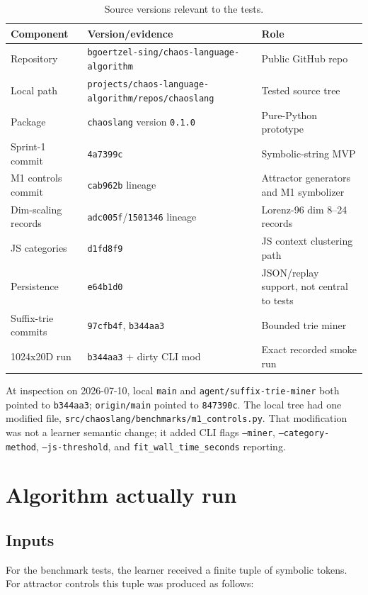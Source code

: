 \documentclass[11pt]{article}
\begin{document}
\begin{table}[ht]
\centering
\small
\begin{tabular}{lll}
\toprule
Component & Version/evidence & Role \\
\midrule
Repository & \texttt{bgoertzel-sing/chaos-language-algorithm} & Public GitHub repo \\
Local path & \texttt{projects/chaos-language-algorithm/repos/chaoslang} & Tested source tree \\
Package & \texttt{chaoslang} version \texttt{0.1.0} & Pure-Python prototype \\
Sprint-1 commit & \texttt{4a7399c} & Symbolic-string MVP \\
M1 controls commit & \texttt{cab962b} lineage & Attractor generators and M1 symbolizer \\
Dim-scaling records & \texttt{adc005f}/\texttt{1501346} lineage & Lorenz-96 dim 8--24 records \\
JS categories & \texttt{d1fd8f9} & JS context clustering path \\
Persistence & \texttt{e64b1d0} & JSON/replay support, not central to tests \\
Suffix-trie commits & \texttt{97cfb4f}, \texttt{b344aa3} & Bounded trie miner \\
1024x20D run & \texttt{b344aa3} + dirty CLI mod & Exact recorded smoke run \\
\bottomrule
\end{tabular}
\caption{Source versions relevant to the tests.}
\end{table}

At inspection on 2026-07-10, local \texttt{main} and \texttt{agent/suffix-trie-miner} both pointed to \texttt{b344aa3}; \texttt{origin/main} pointed to \texttt{847390c}. The local tree had one modified file, \texttt{src/chaoslang/benchmarks/m1\_controls.py}. That modification was not a learner semantic change; it added CLI flags \texttt{--miner}, \texttt{--category-method}, \texttt{--js-threshold}, and \texttt{fit\_wall\_time\_seconds} reporting.

\section{Algorithm actually run}

\subsection{Inputs}

For the benchmark tests, the learner received a finite tuple of symbolic tokens. For attractor controls this tuple was produced as follows:
\end{document}
